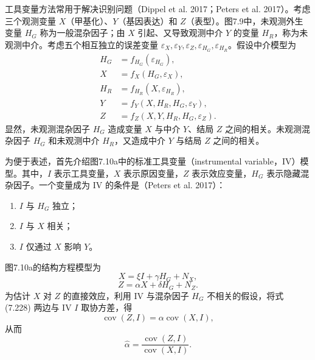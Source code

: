 工具变量方法常用于解决识别问题（Dippel et al. 2017；Peters et al. 2017）。考虑三个观测变量 $X$（甲基化）、$Y$（基因表达）和 $Z$（表型）。图7.9中，未观测外生变量 $H_G$ 称为一般混杂因子；由 $X$ 引起、又导致观测中介 $Y$ 的变量 $H_R$，称为未观测中介。考虑五个相互独立的误差变量 $\varepsilon_X,\varepsilon_Y,\varepsilon_Z,\varepsilon_{H_G},\varepsilon_{H_R}$。假设中介模型为
\begin{equation}
\begin{aligned}
H_G&=f_{H_G}(\varepsilon_{H_G}),\\
X&=f_X(H_G,\varepsilon_X),\\
H_R&=f_{H_R}(X,\varepsilon_{H_R}),\\
Y&=f_Y(X,H_R,H_G,\varepsilon_Y),\\
Z&=f_Z(X,Y,H_R,H_G,\varepsilon_Z).
\end{aligned}
\tag{7.226}
\end{equation}
显然，未观测混杂因子 $H_G$ 造成变量 $X$ 与中介 $Y$、结局 $Z$ 之间的相关。未观测混杂因子 $H_G$ 和未观测中介 $H_R$，又造成中介 $Y$ 与结局 $Z$ 之间的相关。

为便于表述，首先介绍图7.10a中的标准工具变量（instrumental variable，IV）模型。其中，$I$ 表示工具变量，$X$ 表示原因变量，$Z$ 表示效应变量，$H_G$ 表示隐藏混杂因子。一个变量成为 IV 的条件是（Peters et al. 2017）：
\begin{enumerate}
\item $I$ 与 $H_G$ 独立；
\item $I$ 与 $X$ 相关；
\item $I$ 仅通过 $X$ 影响 $Y$。
\end{enumerate}


图7.10a的结构方程模型为
\begin{equation}
X=\xi I+\gamma H_G+N_X,
\tag{7.227}
\end{equation}
\begin{equation}
Z=\alpha X+\delta H_G+N_Z.
\tag{7.228}
\end{equation}
为估计 $X$ 对 $Z$ 的直接效应，利用 IV 与混杂因子 $H_G$ 不相关的假设，将式 (7.228) 两边与 IV $I$ 取协方差，得
\[
\operatorname{cov}(Z,I)=\alpha\operatorname{cov}(X,I),
\]
从而
\begin{equation}
\widehat\alpha=\frac{\operatorname{cov}(Z,I)}{\operatorname{cov}(X,I)}.
\tag{7.229}
\end{equation}

